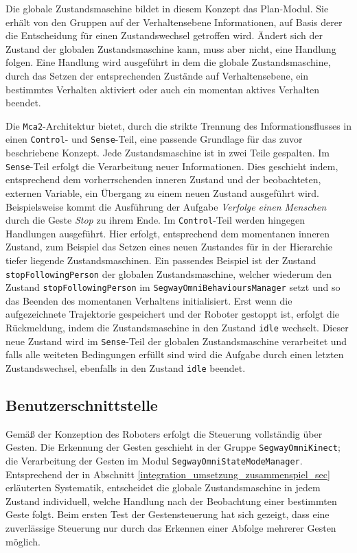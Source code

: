 Die globale Zustandsmaschine bildet in diesem Konzept das Plan-Modul. Sie erhält von den Gruppen auf 
der Verhaltensebene Informationen, auf Basis derer die Entscheidung für einen Zustandswechsel 
getroffen wird. Ändert sich der Zustand der globalen Zustandsmaschine kann, muss aber nicht, eine 
Handlung folgen. Eine Handlung wird ausgeführt in dem die globale Zustandsmaschine, durch das 
Setzen der entsprechenden Zustände auf Verhaltensebene, ein bestimmtes Verhalten aktiviert oder 
auch ein momentan aktives Verhalten beendet.

Die \lstinline{Mca2}-Architektur bietet, durch die strikte Trennung des Informationsflusses in 
einen \lstinline{Control}- und \lstinline{Sense}-Teil, eine passende Grundlage für das zuvor 
beschriebene Konzept. Jede Zustandsmaschine ist in zwei Teile gespalten. Im \lstinline{Sense}-Teil 
erfolgt die Verarbeitung neuer Informationen. Dies geschieht indem, entsprechend dem vorherrschenden 
inneren Zustand und der beobachteten, externen Variable, ein Übergang zu einem neuen Zustand 
ausgeführt wird. Beispielsweise kommt die Ausführung der Aufgabe \textit{Verfolge einen Menschen} 
durch die Geste \textit{Stop} zu ihrem Ende. Im \lstinline{Control}-Teil werden hingegen 
Handlungen ausgeführt. Hier erfolgt, entsprechend dem momentanen inneren Zustand, zum Beispiel 
das Setzen eines neuen Zustandes für in der Hierarchie tiefer liegende Zustandsmaschinen. 
Ein passendes Beispiel ist der Zustand \lstinline{stopFollowingPerson} der globalen Zustandsmaschine, 
welcher wiederum den Zustand \lstinline{stopFollowingPerson} im \lstinline{SegwayOmniBehavioursManager} 
setzt und so das Beenden des momentanen Verhaltens initialisiert. Erst wenn die aufgezeichnete 
Trajektorie gespeichert und der Roboter gestoppt ist, erfolgt die Rückmeldung, indem die 
Zustandsmaschine in den Zustand \lstinline{idle} wechselt. Dieser neue Zustand wird 
im \lstinline{Sense}-Teil der globalen Zustandsmaschine verarbeitet und falls alle weiteten 
Bedingungen erfüllt sind wird die Aufgabe durch einen letzten Zustandswechsel, ebenfalls in 
den Zustand \lstinline{idle} beendet.


\subsection{Benutzerschnittstelle}
\label{benutzerschnittstelle_integration_cha}

Gemäß der Konzeption des Roboters erfolgt die Steuerung vollständig über Gesten. Die Erkennung der Gesten 
geschieht in der Gruppe \lstinline{SegwayOmniKinect}; die Verarbeitung der Gesten im Modul \lstinline{SegwayOmniStateModeManager}. Entsprechend der in Abschnitt \ref{integration_umsetzung_zusammenspiel_sec}
 erläuterten Systematik, entscheidet die globale Zustandsmaschine in jedem Zustand individuell, welche Handlung 
 nach der Beobachtung einer bestimmten Geste folgt. Beim ersten Test der Gestensteuerung hat sich gezeigt, 
 dass eine zuverlässige Steuerung nur durch das Erkennen einer Abfolge mehrerer Gesten möglich. 


